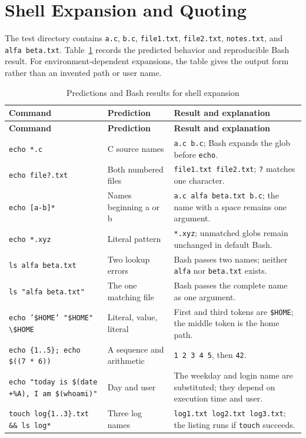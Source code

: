 \documentclass[12pt]{article}
\newcommand{\cmd}[1]{\texttt{#1}}
\begin{document}
\section{Shell Expansion and Quoting}
The test directory contains \cmd{a.c}, \cmd{b.c}, \cmd{file1.txt}, \cmd{file2.txt}, \cmd{notes.txt}, and \cmd{alfa beta.txt}. Table~\ref{tab:expansion} records the predicted behavior and reproducible Bash result. For environment-dependent expansions, the table gives the output form rather than an invented path or user name.

\begin{longtable}{p{}p{}p{}}
\caption{Predictions and Bash results for shell expansion}\label{tab:expansion}\\
\toprule\textbf{Command} & \textbf{Prediction} & \textbf{Result and explanation}\\\midrule\endfirsthead
\toprule\textbf{Command} & \textbf{Prediction} & \textbf{Result and explanation}\\\midrule\endhead
\cmd{echo *.c} & C source names & \cmd{a.c b.c}; Bash expands the glob before \cmd{echo}.\\
\cmd{echo file?.txt} & Both numbered files & \cmd{file1.txt file2.txt}; \cmd{?} matches one character.\\
\cmd{echo [a-b]*} & Names beginning a or b & \cmd{a.c alfa beta.txt b.c}; the name with a space remains one argument.\\
\cmd{echo *.xyz} & Literal pattern & \cmd{*.xyz}; unmatched globs remain unchanged in default Bash.\\
\cmd{ls alfa beta.txt} & Two lookup errors & Bash passes two names; neither \cmd{alfa} nor \cmd{beta.txt} exists.\\
\cmd{ls "alfa beta.txt"} & The one matching file & Bash passes the complete name as one argument.\\
\cmd{echo '\$HOME' "\$HOME" \textbackslash\$HOME} & Literal, value, literal & First and third tokens are \cmd{\$HOME}; the middle token is the home path.\\
\cmd{echo \{1..5\}; echo \$((7 * 6))} & A sequence and arithmetic & \cmd{1 2 3 4 5}, then \cmd{42}.\\
\cmd{echo "today is \$(date +\%A), I am \$(whoami)"} & Day and user & The weekday and login name are substituted; they depend on execution time and user.\\
\cmd{touch log\{1..3\}.txt \&\& ls log*} & Three log names & \cmd{log1.txt log2.txt log3.txt}; the listing runs if \cmd{touch} succeeds.\\
\bottomrule
\end{longtable}
\end{document}

